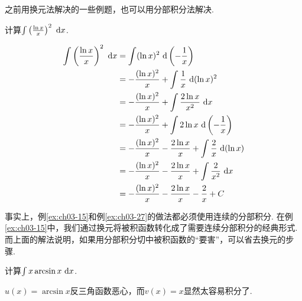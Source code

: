 之前用换元法解决的一些例题，也可以用分部积分法解决.

\begin{example}
\label{ex:ch03-27}
计算$\int \left( \frac{\ln x}{x} \right)^2 ~\mathrm{d} x$.
\end{example}

\begin{solution}
\begin{equation}
    \begin{aligned}
        \int \left( \frac{\ln x}{x} \right)^2 ~\mathrm{d} x
        &= \int (\ln x)^2 ~\mathrm{d} \left( -\frac{1}{x} \right)  \\
        &= -\frac{(\ln x)^2}{x} + \int \frac{1}{x} ~\mathrm{d} (\ln x)^2 \\
        &= -\frac{(\ln x)^2}{x} + \int \frac{2\ln x}{x^2} ~\mathrm{d} x \\
        &= -\frac{(\ln x)^2}{x} + \int 2\ln x ~\mathrm{d} \left(-\frac{1}{x} \right)  \\
        &= -\frac{(\ln x)^2}{x} - \frac{2 \ln x}{x} +\int \frac{2}{x} ~\mathrm{d} (\ln x) \\
        &= -\frac{(\ln x)^2}{x} - \frac{2 \ln x}{x} +\int \frac{2}{x^2} ~\mathrm{d} x \\
        &= -\frac{(\ln x)^2}{x} - \frac{2 \ln x}{x} -\frac{2}{x} +C
        \nonumber
    \end{aligned}
\end{equation}
\end{solution}

事实上，例\ref{ex:ch03-15}和例\ref{ex:ch03-27}的做法都必须使用连续的分部积分. 在例\ref{ex:ch03-15}中，我们通过换元将被积函数转化成了需要连续分部积分的经典形式.
而上面的解法说明，如果用分部积分切中被积函数的“要害”，可以省去换元的步骤.

\begin{example}
\label{ex:ch03-28}
计算$\int x \arcsin x ~\mathrm{d} x$.
\end{example}

\begin{analysis}
$u(x)=\arcsin x$反三角函数恶心，而$v(x)=x$显然太容易积分了.
\end{analysis}

